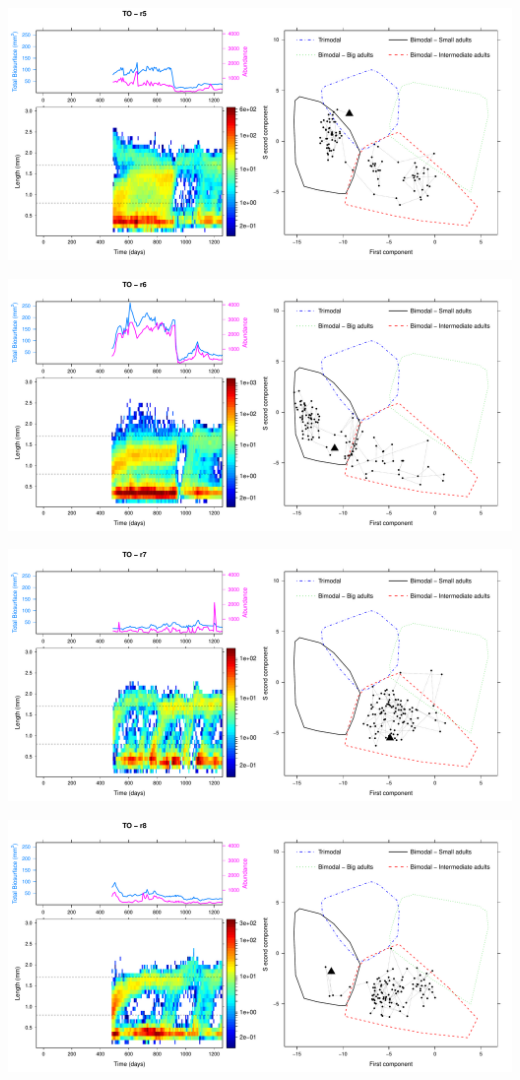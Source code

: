 \includegraphics[height=0.33\textheight]{3-1_ChapExp1/Fig/TO-21-r5}

\includegraphics[height=0.33\textheight]{3-1_ChapExp1/Fig/TO-21-r6}

\includegraphics[height=0.33\textheight]{3-1_ChapExp1/Fig/TO-21-r7}

\includegraphics[height=0.33\textheight]{3-1_ChapExp1/Fig/TO-21-r8}

